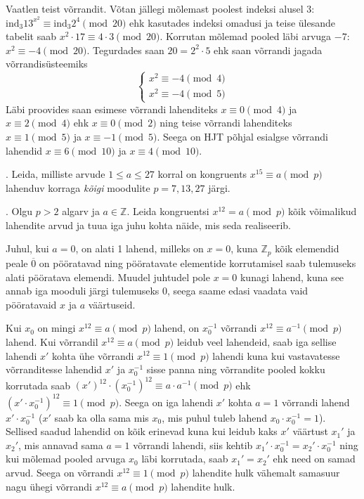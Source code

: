 \documentclass[a4paper, 10pt]{article}
\newcommand{\Z}{\mathbb{Z}}
\newcommand{\w}{\overline}
\newcommand{\ind}{\mathrm{ind}}
\begin{document}
Vaatlen teist võrrandit. Võtan jällegi mõlemast poolest indeksi alusel 3: $\ind_{3}13^{x^2}\equiv\ind_{3}2^4\pmod{20}$ ehk kasutades indeksi omadusi ja teise ülesande tabelit saab $x^2\cdot 17\equiv4\cdot3\pmod{20}$. Korrutan mõlemad pooled läbi arvuga $-7$: $x^2\equiv-4\pmod{20}$. Tegurdades saan $20=2^2\cdot5$ ehk saan võrrandi jagada võrrandisüsteemiks $$\begin{cases}x^2\equiv-4\pmod{4}\\x^2\equiv-4\pmod{5}\end{cases}$$ Läbi proovides saan esimese võrrandi lahenditeks $x\equiv0\pmod4$ ja $x\equiv2\pmod4$ ehk $x\equiv0\pmod2$ ning teise võrrandi lahenditeks $x\equiv1\pmod5$ ja $x\equiv-1\pmod5$. Seega on HJT põhjal esialgse võrrandi lahendid $x\equiv6\pmod{10}$ ja $x\equiv 4\pmod{10}$.
\bigskip

. Leida, milliste arvude $1\leq a\leq 27$ korral on kongruents $x^{15}\equiv a\pmod{p}$ lahenduv korraga \emph{kõigi} moodulite $p=7,13,27$ järgi.

\bigskip

. Olgu $p>2$ algarv ja $a\in\Z$. Leida kongruentsi $x^{12}=a \pmod{p}$ kõik võimalikud lahendite arvud ja tuua iga juhu kohta näide, mis seda realiseerib. 

\bigskip
Juhul, kui $a=0$, on alati 1 lahend, milleks on $x=0$, kuna $\Z_p$ kõik elemendid peale $\w0$ on pööratavad ning pööratavate elementide korrutamisel saab tulemuseks alati pööratava elemendi. Muudel juhtudel pole $x=0$ kunagi lahend, kuna see annab iga mooduli järgi tulemuseks 0, seega saame edasi vaadata vaid pööratavaid $x$ ja $a$ väärtuseid.

Kui $x_0$ on mingi $x^{12}\equiv a\pmod p$ lahend, on $x_0^{-1}$ võrrandi $x^{12}\equiv a^{-1}\pmod p$ lahend. Kui võrrandil $x^{12}\equiv a\pmod p$ leidub veel lahendeid, saab iga sellise lahendi $x'$ kohta ühe võrrandi $x^{12}\equiv1\pmod p$ lahendi kuna kui vastavatesse võrranditesse lahendid $x'$ ja $x_0^{-1}$ sisse panna ning võrrandite pooled kokku korrutada saab $(x')^{12}\cdot{(x_0^{-1})^{12}}\equiv a\cdot a^{-1}\pmod p$ ehk $(x'\cdot x_0^{-1})^{12}\equiv1\pmod p$. Seega on iga lahendi $x'$ kohta $a=1$ võrrandi lahend $x'\cdot x_0^{-1}$ ($x'$ saab ka olla sama mis $x_0$, mis puhul tuleb lahend $x_0\cdot x_0^{-1}=1$). Sellised saadud lahendid on kõik erinevad kuna kui leidub kaks $x'$ väärtust $x_1'$ ja $x_2'$, mis annavad sama $a=1$ võrrandi lahendi, siis kehtib $x_1'\cdot x_0^{-1}=x_2'\cdot x_0^{-1}$ ning kui mõlemad pooled arvuga $x_0$ läbi korrutada, saab $x_1'=x_2'$ ehk need on samad arvud. Seega on võrrandi $x^{12}\equiv1\pmod p$ lahendite hulk vähemalt samasuur nagu ühegi võrrandi $x^{12}\equiv a\pmod p$ lahendite hulk.
\end{document}
